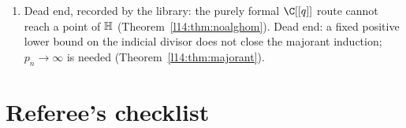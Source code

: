 \begin{enumerate}
  (, ); ``not connected to a VOA'' ();
   misnamed (); (C2) unbuilt and (C3) prerequisite
  contradiction ( vs );  ``not proved''
  ();  ``OPEN'' (); $\Vnat$ ``does
  not exist'' and $[q^2]j$ ``open'' ( and siblings) (all documentation only).
\item Dead end, recorded by the library: the purely formal $\C[[q]]$ route cannot reach a point of $\mathbb{H}$
  (Theorem~\ref{l14:thm:noalghom}). Dead end: a fixed positive lower bound on the indicial divisor does not close the majorant
  induction; $p_n\to\infty$ is needed (Theorem~\ref{l14:thm:majorant}).
\end{enumerate}

\section{Referee's checklist}\label{l14:sec:checklist}

